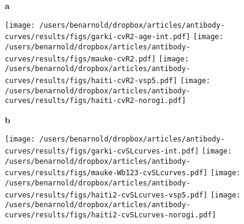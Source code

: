 \documentclass[11pt]{article}
\begin{document}
\clearpage
\begin{landscape}

\begin{figure}[htbp]
{\Large \textbf{a}}
\vspace{-10pt}
\begin{center}
\texttt{[image: /users/benarnold/dropbox/articles/antibody-curves/results/figs/garki-cvR2-age-int.pdf]}
\texttt{[image: /users/benarnold/dropbox/articles/antibody-curves/results/figs/mauke-cvR2.pdf]}
\texttt{[image: /users/benarnold/dropbox/articles/antibody-curves/results/figs/haiti-cvR2-vsp5.pdf]}
\texttt{[image: /users/benarnold/dropbox/articles/antibody-curves/results/figs/haiti-cvR2-norogi.pdf]}\\
\end{center}
{\Large \textbf{b}}
\vspace{-10pt}
\begin{center}

\texttt{[image: /users/benarnold/dropbox/articles/antibody-curves/results/figs/garki-cvSLcurves-int.pdf]}
\texttt{[image: /users/benarnold/dropbox/articles/antibody-curves/results/figs/mauke-Wb123-cvSLcurves.pdf]}
\texttt{[image: /users/benarnold/dropbox/articles/antibody-curves/results/figs/haiti2-cvSLcurves-vsp5.pdf]}
\texttt{[image: /users/benarnold/dropbox/articles/antibody-curves/results/figs/haiti2-cvSLcurves-norogi.pdf]}


\end{center}
\end{figure}
\end{landscape}
\end{document}
